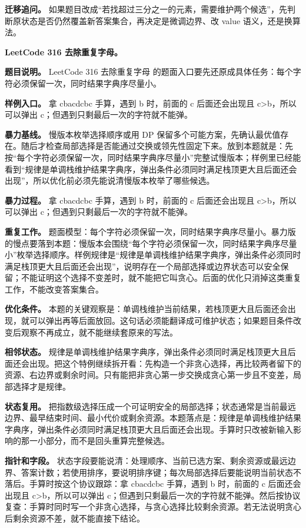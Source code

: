 \textbf{迁移追问。} 如果题目改成“若找超过三分之一的元素，需要维护两个候选”，先判断原状态是否仍然覆盖新答案集合，再决定是微调边界、改 value 语义，还是换算法。

\noindent\textbf{LeetCode 316 去除重复字母。}

\textbf{题目说明。} LeetCode 316 去除重复字母 的题面入口要先还原成具体任务：每个字符必须保留一次，同时结果字典序尽量小。

\textbf{样例入口。} 拿 cbacdcbc 手算，遇到 b 时，前面的 c 后面还会出现且 c>b，所以可以弹出 c；但遇到只剩最后一次的字符就不能弹。

\textbf{暴力基线。} 慢版本枚举选择顺序或用 DP 保留多个可能方案，先确认最优值存在。随后才检查局部选择是否能通过交换或领先性固定下来。放到本题就是：先按“每个字符必须保留一次，同时结果字典序尽量小”完整试慢版本；样例里已经能看到“规律是单调栈维护结果字典序，弹出条件必须同时满足栈顶更大且后面还会出现”，所以优化前必须先能说清慢版本枚举了哪些候选。

\textbf{暴力过程。} 拿 cbacdcbc 手算，遇到 b 时，前面的 c 后面还会出现且 c>b，所以可以弹出 c；但遇到只剩最后一次的字符就不能弹。

\textbf{重复工作。} 题面模型：每个字符必须保留一次，同时结果字典序尽量小。暴力版的慢点要落到本题：慢版本会围绕“每个字符必须保留一次，同时结果字典序尽量小”枚举选择顺序。样例规律是“规律是单调栈维护结果字典序，弹出条件必须同时满足栈顶更大且后面还会出现”，说明存在一个局部选择或边界状态可以安全保留；不能证明这个选择不变差时，就不能把它叫贪心。后面的优化只消掉这类重复工作，不能改变答案集合。

\textbf{优化条件。} 本题的关键观察是：单调栈维护当前结果，若栈顶更大且后面还会出现，就可以弹出再等后面放回。这句话必须能翻译成可维护状态；如果题目条件改变后观察不再成立，就不能继续套原来的写法。

\textbf{相邻状态。} 规律是单调栈维护结果字典序，弹出条件必须同时满足栈顶更大且后面还会出现。把这个特例继续拆开看：先构造一个非贪心选择，再比较两者留下的资源、右边界或剩余时间。只有能把非贪心第一步交换成贪心第一步且不变差，局部选择才是规律。

\textbf{状态复用。} 把指数级选择压成一个可证明安全的局部选择；状态通常是当前最远边界、最早结束时间、最小代价或剩余资源。本题落点是：规律是单调栈维护结果字典序，弹出条件必须同时满足栈顶更大且后面还会出现。手算时只改被新输入影响的那一小部分，而不是回头重算完整候选。

\textbf{指针和字段。} 状态字段要能说清：处理顺序、当前已选方案、剩余资源或最远边界、答案计数；若使用排序，要说明排序键；每次局部选择后要能说明当前状态不落后。手算时按这个协议跟踪：拿 cbacdcbc 手算，遇到 b 时，前面的 c 后面还会出现且 c>b，所以可以弹出 c；但遇到只剩最后一次的字符就不能弹。然后按协议复查：手算时同时写一个非贪心选择，与贪心选择比较剩余资源。若无法说明贪心后剩余资源不差，就不能直接下结论。

